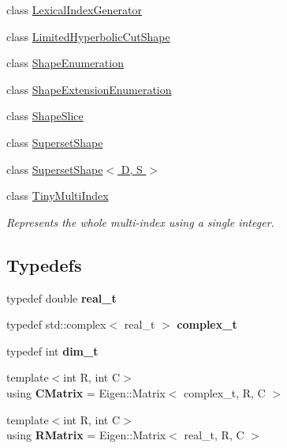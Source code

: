 \begin{DoxyCompactItemize}
class \hyperlink{classwaveblocks_1_1_lexical_index_generator}{Lexical\+Index\+Generator}
\item 
class \hyperlink{classwaveblocks_1_1_limited_hyperbolic_cut_shape}{Limited\+Hyperbolic\+Cut\+Shape}
\item 
class \hyperlink{classwaveblocks_1_1_shape_enumeration}{Shape\+Enumeration}
\item 
class \hyperlink{classwaveblocks_1_1_shape_extension_enumeration}{Shape\+Extension\+Enumeration}
\item 
class \hyperlink{classwaveblocks_1_1_shape_slice}{Shape\+Slice}
\item 
class \hyperlink{classwaveblocks_1_1_superset_shape}{Superset\+Shape}
\item 
class \hyperlink{classwaveblocks_1_1_superset_shape_3_01_d_00_01_s_01_4}{Superset\+Shape$<$ D, S $>$}
\item 
class \hyperlink{classwaveblocks_1_1_tiny_multi_index}{Tiny\+Multi\+Index}
\begin{DoxyCompactList}\small\item\em Represents the whole multi-\/index using a single integer. \end{DoxyCompactList}\end{DoxyCompactItemize}
\subsection*{Typedefs}
\begin{DoxyCompactItemize}
\item 
\hypertarget{namespacewaveblocks_aef2771725ef8eef26de30f1cacbf51f0}{}typedef double {\bfseries real\+\_\+t}\label{namespacewaveblocks_aef2771725ef8eef26de30f1cacbf51f0}

\item 
\hypertarget{namespacewaveblocks_ad0bf8f32f6795baf7563bec7b8884220}{}typedef std\+::complex$<$ real\+\_\+t $>$ {\bfseries complex\+\_\+t}\label{namespacewaveblocks_ad0bf8f32f6795baf7563bec7b8884220}

\item 
\hypertarget{namespacewaveblocks_a7f1215e373913b42cf1cdd01c1da2bb1}{}typedef int {\bfseries dim\+\_\+t}\label{namespacewaveblocks_a7f1215e373913b42cf1cdd01c1da2bb1}

\item 
\hypertarget{namespacewaveblocks_ab1651e881bd9d580e00f828bfbcf6f14}{}{\footnotesize template$<$int R, int C$>$ }\\using {\bfseries C\+Matrix} = Eigen\+::\+Matrix$<$ complex\+\_\+t, R, C $>$\label{namespacewaveblocks_ab1651e881bd9d580e00f828bfbcf6f14}

\item 
\hypertarget{namespacewaveblocks_a3d4572be26f753e308fac1b66c107dd6}{}{\footnotesize template$<$int R, int C$>$ }\\using {\bfseries R\+Matrix} = Eigen\+::\+Matrix$<$ real\+\_\+t, R, C $>$\label{namespacewaveblocks_a3d4572be26f753e308fac1b66c107dd6}

\end{DoxyCompactItemize}

